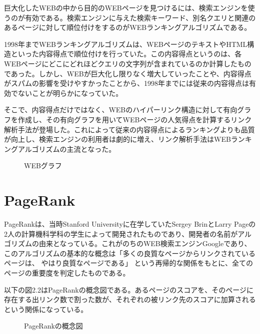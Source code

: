 \documentclass[a4paper,11pt]{jreport}
\begin{document}
巨大化したWEBの中から目的のWEBページを見つけるには、検索エンジンを使うのが有効である。検索エンジンに与えた検索キーワード、別名クエリと関連のあるページに対して順位付けをするのがWEBランキングアルゴリズムである。

1998年までWEBランキングアルゴリズムは、WEBページのテキストやHTML構造といった内容得点で順位付けを行っていた。この内容得点というのは、各WEBページにどこにどれほどクエリの文字列が含まれているのか計算したものであった。しかし、WEBが巨大化し限りなく増大していったことや、内容得点がスパムの影響を受けやすかったことから、1998年までには従来の内容得点は有効でないことが明らかになっていた。

そこで、内容得点だけではなく、WEBのハイパーリンク構造に対して有向グラフを作成し、その有向グラフを用いてWEBページの人気得点を計算するリンク解析手法が登場した。これによって従来の内容得点によるランキングよりも品質が向上し、検索エンジンの利用者は劇的に増え、リンク解析手法はWEBランキングアルゴリズムの主流となった。


\begin{figure}[htbp]
\begin{center}
\end{center}
\caption{WEBグラフ}
\label{figure:sample}
\end{figure}


\section{PageRank}

PageRankは、当時Stanford Universityに在学していたSergey BrinとLarry Pageの2人の計算機科学科の学生によって開発されたものであり、開発者の名前がアルゴリズムの由来となっている。これがのちのWEB検索エンジンGoogleであり、このアルゴリズムの基本的な概念は「多くの良質なページからリンクされているページは、 やはり良質なページである」 という再帰的な関係をもとに、全てのページの重要度を判定したものである。

以下の図2.2はPageRankの概念図である。あるページのスコアを、そのページに存在する出リンク数で割った数が、それぞれの被リンク先のスコアに加算されるという関係になっている。

\begin{figure}[htbp]
\begin{center}
\end{center}
\caption{PageRankの概念図}
\label{figure:sample}
\end{figure}
\end{document}
